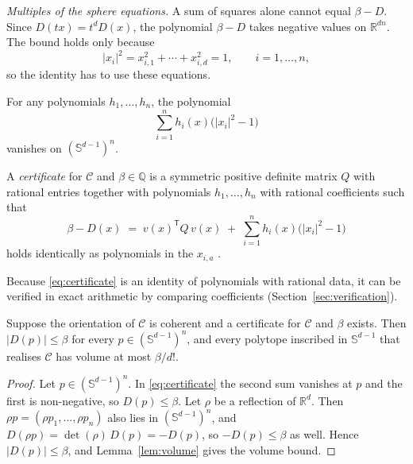\emph{Multiples of the sphere equations.} A sum of squares alone cannot
equal $\beta - D$. Since $D(tx) = t^{d} D(x)$, the polynomial $\beta - D$
takes negative values on $\mathbb{R}^{dn}$. The bound holds only because
\[
  \lvert x_{i}\rvert^{2} = x_{i,1}^{2} + \cdots + x_{i,d}^{2} = 1,
  \qquad i = 1, \ldots, n,
\]
so the identity has to use these equations.

For any polynomials $h_{1}, \ldots, h_{n}$, the polynomial
\[
  \sum_{i=1}^{n} h_{i}(x)\bigl(\lvert x_{i}\rvert^{2} - 1\bigr)
\]
vanishes on $(\mathbb{S}^{d-1})^{n}$.

\begin{definition}
  \label{def:certificate}
  A \emph{certificate} for $\mathcal{C}$ and $\beta \in \mathbb{Q}$ is a
  symmetric positive definite matrix $Q$ with rational entries together with
  polynomials $h_{1}, \ldots, h_{n}$ with rational coefficients such that
  \begin{equation}
    \label{eq:certificate}
    \beta - D(x) \;=\; v(x)^{\mathsf{T}} Q\, v(x)
    \;+\; \sum_{i=1}^{n} h_{i}(x)\bigl(\lvert x_{i}\rvert^{2} - 1\bigr)
  \end{equation}
  holds identically as polynomials in the $x_{i,a}$ .
\end{definition}

Because \eqref{eq:certificate} is an identity of polynomials with rational
data, it can be verified in exact arithmetic by comparing coefficients
(Section~\ref{sec:verification}).

\begin{proposition}
  \label{prop:certificate}
  Suppose the orientation of $\mathcal{C}$ is coherent and a certificate for
  $\mathcal{C}$ and $\beta$ exists. Then $\lvert D(p)\rvert \leq \beta$ for
  every $p \in (\mathbb{S}^{d-1})^{n}$, and every polytope inscribed in
  $\mathbb{S}^{d-1}$ that realises $\mathcal{C}$ has volume at most
  $\beta/d!$.
\end{proposition}

\begin{proof}
  Let $p \in (\mathbb{S}^{d-1})^{n}$. In \eqref{eq:certificate} the second sum
  vanishes at $p$ and the first is non-negative, so $D(p) \leq \beta$. Let
  $\rho$ be a reflection of $\mathbb{R}^{d}$. Then
  $\rho p = (\rho p_{1}, \ldots, \rho p_{n})$ also lies in
  $(\mathbb{S}^{d-1})^{n}$, and $D(\rho p) = \det(\rho)\,D(p) = -D(p)$, so
  $-D(p) \leq \beta$ as well. Hence $\lvert D(p)\rvert \leq \beta$, and
  Lemma~\ref{lem:volume} gives the volume bound.
\end{proof}

